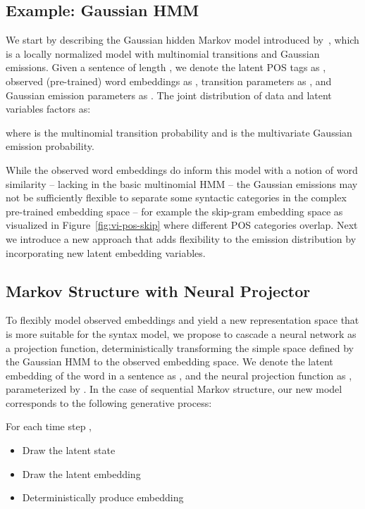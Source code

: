 \documentclass[11pt,a4paper]{article}
\begin{document}
\subsection{Example: Gaussian HMM}

We start by describing the Gaussian hidden Markov model introduced by~\citet{lin2015unsupervised}, which is a locally normalized model with multinomial transitions and Gaussian emissions. Given a sentence of length , we denote the latent POS tags as , observed (pre-trained) word embeddings as , transition parameters as , and Gaussian emission parameters as . The joint distribution of data and latent variables factors as:
\vspace{-3mm}

where  is the multinomial transition probability and  is the multivariate Gaussian emission probability. 






While the observed word embeddings do inform this model with a notion of word similarity -- lacking in the basic multinomial HMM -- the Gaussian emissions may not be sufficiently flexible to separate some syntactic categories in the complex pre-trained embedding space -- for example the skip-gram embedding space as visualized in Figure~\ref{fig:vi-pos-skip} where different POS categories overlap. 
Next we introduce a new approach that adds flexibility to the emission distribution by incorporating new latent embedding variables.


\subsection{Markov Structure with Neural Projector}
\label{sec:hmm-neural}
To flexibly model observed embeddings and yield a new representation space that is more suitable for the syntax model, we propose to cascade a neural network as a projection function, deterministically transforming the simple space defined by the Gaussian HMM to the observed embedding space. We denote the latent embedding of the  word in a sentence as , and the neural projection function as , parameterized by . In the case of sequential Markov structure, our new model corresponds to the following generative process:


\vspace{2mm}
\noindent For each time step ,
\vspace{-2mm}
  \begin{itemize}[noitemsep, leftmargin=*]
   \item Draw the latent state  
   \item Draw the latent embedding 
   \item Deterministically produce embedding \\
  \end{itemize}
\vspace{0mm}
\end{document}
